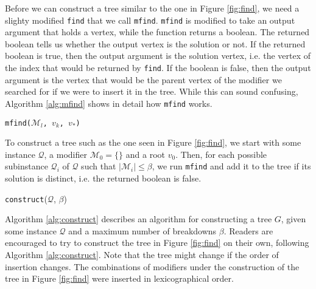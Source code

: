 Before we can construct a tree similar to the one in Figure \ref{fig:find},
we need a slighty modified \texttt{find} that we call \texttt{mfind}.
\texttt{mfind} is modified to take an output argument that holds a vertex,
while the function returns a boolean.
The returned boolean tells us whether the output vertex is the solution or not.
If the returned boolean is true, then the output argument is the solution
vertex, i.e. the vertex of the index that would be returned by \texttt{find}.
If the boolean is false, then the output argument is the vertex that would be
the parent vertex of the modifier we searched for if we were to insert it in
the tree.
While this can sound confusing, Algorithm \ref{alg:mfind} shows in detail how
\texttt{mfind} works.

\begin{algorithm}[ht!]
\caption{\texttt{mfind($\mathcal{M}_l$, $v_k$, $v_*$)}}
\label{alg:mfind}

\end{algorithm}
To construct a tree such as the one seen in Figure \ref{fig:find}, we start
with some instance $\mathcal{Q}$, a modifier $\mathcal{M}_0 = \{ {} \}$ and
a root $v_0$.
Then, for each possible subinstance $\mathcal{Q}_i$ of $\mathcal{Q}$ such that
$|\mathcal{M}_i| \leq \beta$, we run \texttt{mfind} and add it to the tree if
its solution is distinct, i.e. the returned boolean is false.

\begin{algorithm}[ht!]
\caption{\texttt{construct}($\mathcal{Q}$, $\beta$)}
\label{alg:construct}

\end{algorithm}
Algorithm \ref{alg:construct} describes an algorithm for constructing a tree
$G$, given some instance $\mathcal{Q}$ and a maximum number of breakdowns
$\beta$.
Readers are encouraged to try to construct the tree in Figure \ref{fig:find} on
their own, following Algorithm \ref{alg:construct}.
Note that the tree might change if the order of
insertion changes. The combinations of modifiers under the construction of the
tree in Figure \ref{fig:find} were inserted in lexicographical order.

